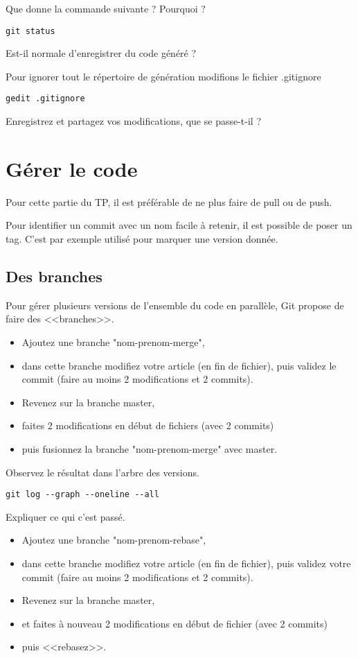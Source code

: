 \documentclass[a4paper]{article}
\begin{document}
Que donne la commande suivante ? Pourquoi ? 
\begin{verbatim}
git status
\end{verbatim}

Est-il normale d'enregistrer du code généré ? 

Pour ignorer tout le répertoire de génération modifions le fichier .gitignore
\begin{verbatim}
gedit .gitignore
\end{verbatim}

Enregistrez et partagez vos modifications, que se passe-t-il ? 

\section{Gérer le code}

Pour cette partie du TP, il est préférable de ne plus faire de pull ou de push.

Pour identifier un commit avec un nom facile à retenir, il est possible de poser un tag. C'est par exemple utilisé pour marquer une version donnée.

\subsection{Des branches}

Pour gérer plusieurs versions de l'ensemble du code en parallèle, Git propose de faire des <<branches>>.

\begin{itemize}
  \item Ajoutez une branche "nom-prenom-merge", 
  \item dans cette branche modifiez votre article (en fin de fichier), puis validez le commit (faire au moins 2 modifications et 2 commits). 
  \item Revenez sur la branche master, 
  \item faites 2 modifications en début de fichiers (avec 2 commits) 
  \item puis fusionnez la branche "nom-prenom-merge" avec master.
\end{itemize}

Observez le résultat dans l'arbre des versions. 
\begin{verbatim}
git log --graph --oneline --all
\end{verbatim}

Expliquer ce qui c'est passé.

\begin{itemize}
  \item Ajoutez une branche "nom-prenom-rebase", 
  \item dans cette branche modifiez votre article (en fin de fichier), puis validez votre commit (faire au moins 2 modifications et 2 commits). 
  \item Revenez sur la branche master, 
  \item et faites à nouveau 2 modifications en début de fichier (avec 2 commits) 
  \item puis <<rebasez>>.
\end{itemize}
\end{document}
